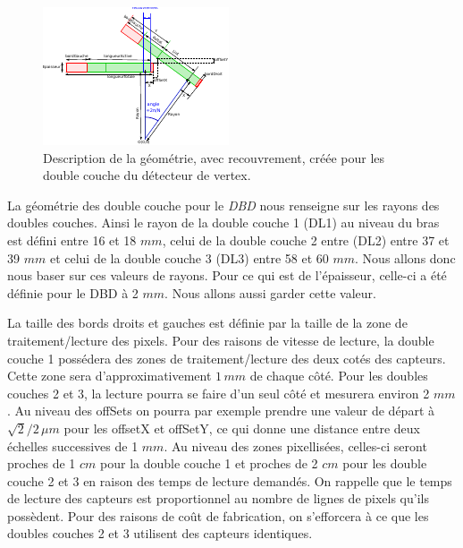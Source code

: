   \medskip

  \begin{figure}[!htb]
    \begin{center}
      \includegraphics[scale=4.00]{./figures/CalculsRecouvrment/Geometry_double_sided_layers.pdf}
      \caption{Description de la g\'eom\'etrie, avec recouvrement, cr\'e\'ee pour les double couche du d\'etecteur de vertex.}
      \label{fig:schemaRecouvrement_DL}
    \end{center}
  \end{figure}
  
  La g\'eom\'etrie des double couche pour le \textit{DBD} nous renseigne sur les rayons des doubles couches. Ainsi le rayon de la double couche 1 (DL1) au niveau du bras est d\'efini entre 16 et 18 $mm$, celui de la double couche 2 entre (DL2) entre 37 et 39 $mm$ et celui de la double couche 3 (DL3) entre 58 et 60 $mm$. Nous allons donc nous baser sur ces valeurs de rayons. Pour ce qui est de l'\'epaisseur, celle-ci a \'et\'e d\'efinie pour le DBD \`a 2 $mm$. Nous allons aussi garder cette valeur.
  
  \medskip
  
  La taille des bords droits et gauches est d\'efinie par la taille de la zone de traitement/lecture des pixels. Pour des raisons de vitesse de lecture, la double couche 1 possédera des zones de traitement/lecture des deux cot\'es des capteurs. Cette zone sera d'approximativement $1 \, mm$ de chaque côt\'e. Pour les doubles couches 2 et 3, la lecture pourra se faire d'un seul côt\'e et mesurera environ 2 $mm$. Au niveau des offSets on pourra par exemple prendre une valeur de d\'epart \`a $\sqrt{2}/2 \, \mu m$ pour les offsetX et offSetY, ce qui donne une distance entre deux \'echelles successives de 1 $mm$. Au niveau des zones pixellis\'ees, celles-ci seront proches de 1 $cm$ pour la double couche 1 et proches de 2 $cm$ pour les double couche 2 et 3 en raison des temps de lecture demand\'es. On rappelle que le temps de lecture des capteurs est proportionnel au nombre de lignes de pixels qu'ils poss\`edent. Pour des raisons de coût de fabrication, on s'efforcera \`a ce que les doubles couches 2 et 3 utilisent des capteurs identiques.
  

